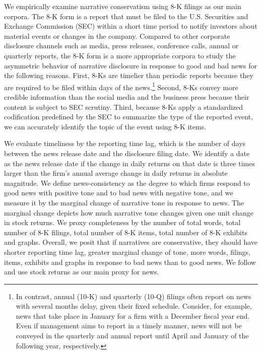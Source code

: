 \documentclass[letterpaper,12pt]{article}
\begin{document}
\begin{spacing}{1.5}
We empirically examine narrative conservatism using 8-K filings as our main corpora. The 8-K form is a report that must be filed to the U.S. Securities and Exchange Commission (SEC) within a short time period to notify investors about material events or changes in the company. Compared to other corporate disclosure channels such as media, press releases, conference calls, annual or quarterly reports, the 8-K form is a more appropriate corpora to study the asymmetric behavior of narrative disclosure in response to good and bad news for the following reasons. First, 8-Ks are timelier than periodic reports because they are required to be filed within days of the news.\footnote{In contrast, annual (10-K) and quarterly (10-Q) filings often report on news with several months delay, given their fixed schedule. Consider, for example, news that take place in January for a firm with a December fiscal year end. Even if management aims to report in a timely manner, news will not be conveyed in the quarterly and annual report until April and January of the following year, respectively.} Second, 8-Ks convey more credible information than the social media and the business press because their content is subject to SEC scrutiny. Third, because 8-Ks apply a standardized codification predefined by the SEC to summarize the type of the reported event, we can accurately identify the topic of the event using 8-K items.

We evaluate timeliness by the reporting time lag, which is the number of days between the news release date and the disclosure filing date. We identify a date as the news release date if the change in daily returns on that date is three times larger than the firm's annual average change in daily returns in absolute magnitude. We define news-consistency as the degree to which firms respond to good news with positive tone and to bad news with negative tone, and we measure it by the marginal change of narrative tone in response to news. The marginal change depicts how much narrative tone changes given one unit change in stock returns. We proxy completeness by the number of total words, total number of 8-K filings, total number of 8-K items, total number of 8-K exhibits and graphs. 
Overall, we posit that if narratives are conservative, they should have shorter reporting time lag, greater marginal change of tone, more words, filings, items, exhibits and graphs in response to bad news than to good news. We follow  and use stock returns as our main proxy for news.


\end{spacing}
\end{document}
